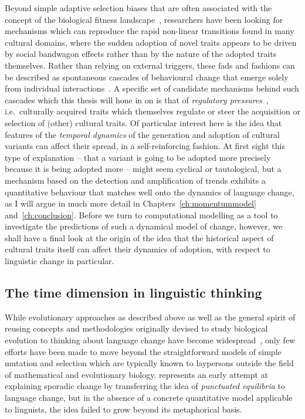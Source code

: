 Beyond simple adaptive selection biases that are often associated with the concept of the biological fitness landscape~\citep{Kaplan2008,Gerlee2015}, researchers have been looking for mechanisms which can reproduce the rapid non-linear transitions found in many cultural domains, where the sudden adoption of novel traits appears to be driven by social bandwagon effects rather than by the nature of the adopted traits themselves. Rather than relying on external triggers, these fads and fashions can be described as spontaneous cascades of behavioural change that emerge solely from individual interactions~\citep{Hirshleifer1995,Bikhchandani1998,Goldstone2008}. A specific set of candidate mechanisms behind such cascades which this thesis will hone in on is that of \emph{regulatory pressures}~\citep{Acerbi2014}, i.e.~culturally acquired traits which themselves regulate or steer the acquisition or selection of (other) cultural traits. Of particular interest here is the idea that features of the \emph{temporal dynamics} of the generation and adoption of cultural variants can affect their spread, in a self-reinforcing fashion. At first sight this type of explanation -- that a variant is going to be adopted more precisely because it is being adopted more -- might seem cyclical or tautological, but a mechanism based on the detection and amplification of trends exhibits a quantitative behaviour that matches well onto the dynamics of language change, as I will argue in much more detail in Chapters~\ref{ch:momentummodel} and~\ref{ch:conclusion}.
Before we turn to computational modelling as a tool to investigate the predictions of such a dynamical model of change, however, we shall have a final look at the origin of the idea that the historical aspect of cultural traits itself can affect their dynamics of adoption, with respect to linguistic change in particular.

\subsection{The time dimension in linguistic thinking}

While evolutionary approaches as described above as well as the general spirit of reusing concepts and methodologies originally devised to study biological evolution to thinking about language change have become widespread~\citep{Atkinson2005}, only few efforts have been made to move beyond the straightforward models of simple mutation and selection which are typically known to laypersons outside the field of mathematical and evolutionary biology.
\citet{Dixon1997} represents an early attempt at explaining sporadic change by transferring the idea of \emph{punctuated equilibria} to language change, but in the absence of a concrete quantitative model applicable to linguists, the idea failed to grow beyond its metaphorical basis.

